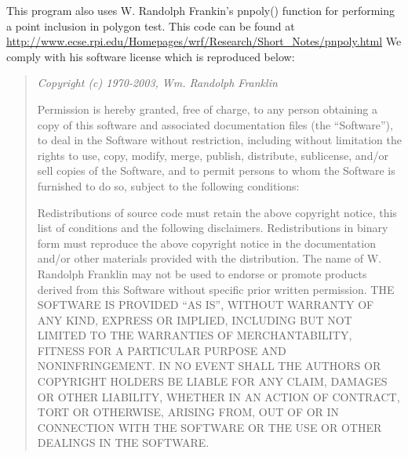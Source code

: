 This program also uses W. Randolph Frankin's pnpoly() 
function for performing a point inclusion in polygon test. 
This code can be found at
\url{http://www.ecse.rpi.edu/Homepages/wrf/Research/Short\_Notes/pnpoly.html}
We comply with his software license which is reproduced below\cite{Franklin05}:
\begin{quotation}\em
Copyright (c) 1970-2003, Wm. Randolph Franklin

Permission is hereby granted, free of charge, to any person obtaining 
a copy of this software and associated documentation files (the 
``Software''), to deal in the Software without restriction, including 
without limitation the rights to use, copy, modify, merge, publish, 
distribute, sublicense, and/or sell copies of the Software, and to 
permit persons to whom the Software is furnished to do so, subject 
to the following conditions:

Redistributions of source code must retain the above copyright 
notice, this list of conditions and the following disclaimers.
Redistributions in binary form must reproduce the above copyright 
notice in the documentation and/or other materials provided with 
the distribution.
The name of W. Randolph Franklin may not be used to endorse or 
promote products derived from this Software without specific 
prior written permission.
THE SOFTWARE IS PROVIDED ``AS IS'', WITHOUT WARRANTY OF ANY KIND, 
EXPRESS OR IMPLIED, INCLUDING BUT NOT LIMITED TO THE WARRANTIES OF 
MERCHANTABILITY, FITNESS FOR A PARTICULAR PURPOSE AND 
NONINFRINGEMENT. IN NO EVENT SHALL THE AUTHORS OR COPYRIGHT HOLDERS 
BE LIABLE FOR ANY CLAIM, DAMAGES OR OTHER LIABILITY, WHETHER IN AN 
ACTION OF CONTRACT, TORT OR OTHERWISE, ARISING FROM, OUT OF OR IN 
CONNECTION WITH THE SOFTWARE OR THE USE OR OTHER DEALINGS IN THE 
SOFTWARE.
\end{quotation}


